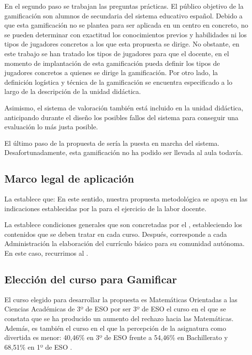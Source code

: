 En el segundo paso se trabajan las preguntas prácticas.
%
El público objetivo de la gamificación son alumnos de secundaria del sistema educativo español. 
%
Debido a que esta gamificación no se plantea para ser aplicada en un centro en concreto, no se pueden determinar con exactitud los conocimientos previos y habilidades ni los tipos de jugadores concretos a los que esta propuesta se dirige.
%
No obstante, en este trabajo se han tratado los tipos de jugadores para que el docente, en el momento de implantación de esta gamificación pueda definir los tipos de jugadores concretos a quienes se dirige la gamificación.
%
Por otro lado, la definición logística y técnica de la gamificación se encuentra especificado a lo largo de la descripción de la unidad didáctica. 

Asimismo, el sistema de valoración también está incluido en la unidad didáctica, anticipando durante el diseño los posibles fallos del sistema para conseguir una evaluación lo más justa posible.

El último paso de la propuesta de \cite{kapp2013gamification} sería la puesta en marcha del sistema. 
%
Desafortunadamente, esta gamificación no ha podido ser llevada al aula todavía.

\subsection{Marco legal de aplicación}

La \lomce establece que:  
%
En este sentido, nuestra propuesta metodológica se apoya en las indicaciones establecidas por la \lomce para el ejercicio de la labor docente.

La \lomce establece condiciones generales que son concretadas por el \boe, estableciendo los contenidos que se deben tratar en cada curso.
%
Después, corresponde a cada Administración la elaboración del currículo básico para su comunidad autónoma.
%
En este caso, recurrimos al \bocm.


\subsection{Elección del curso para Gamificar}

El curso elegido para desarrollar la propuesta es Matemáticas Orientadas a las Ciencias Académicas de 3º de ESO por ser 3º de ESO el curso en el que se constata que se ha producido un aumento del rechazo hacia las Matemáticas.
%
Además, es también el curso en el que la percepción de la asignatura como divertida es menor: 40,46\% en 3º de ESO frente a 54,46\% en Bachillerato y 68,51\% en 1º de ESO \citep{ActitudesHaciaMates}.

